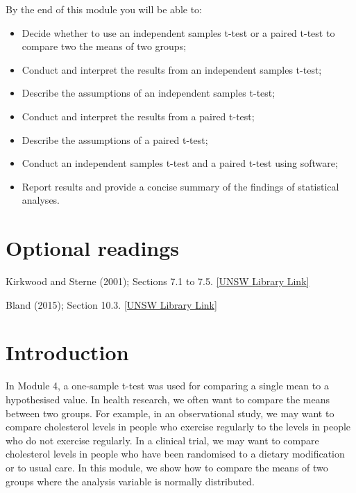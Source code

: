 \documentclass[
  a4paper,
]{memoir}
\providecommand{\tightlist}{%
  \setlength{\itemsep}{0pt}\setlength{\parskip}{0pt}}
\begin{document}

By the end of this module you will be able to:

\begin{itemize}
\tightlist
\item
  Decide whether to use an independent samples t-test or a paired t-test
  to compare two the means of two groups;
\item
  Conduct and interpret the results from an independent samples t-test;
\item
  Describe the assumptions of an independent samples t-test;
\item
  Conduct and interpret the results from a paired t-test;
\item
  Describe the assumptions of a paired t-test;
\item
  Conduct an independent samples t-test and a paired t-test using
  software;
\item
  Report results and provide a concise summary of the findings of
  statistical analyses.
\end{itemize}

\section*{Optional readings}\label{optional-readings-4}


Kirkwood and Sterne (2001); Sections 7.1 to 7.5.
\href{http://er1.library.unsw.edu.au/er/cgi-bin/eraccess.cgi?url=https://ebookcentral.proquest.com/lib/unsw/detail.action?docID=624728}{{[}UNSW
Library Link{]}}

Bland (2015); Section 10.3.
\href{http://er1.library.unsw.edu.au/er/cgi-bin/eraccess.cgi?url=https://ebookcentral.proquest.com/lib/unsw/detail.action?docID=5891730}{{[}UNSW
Library Link{]}}

\section{Introduction}\label{introduction-4}

In Module 4, a one-sample t-test was used for comparing a single mean to
a hypothesised value. In health research, we often want to compare the
means between two groups. For example, in an observational study, we may
want to compare cholesterol levels in people who exercise regularly to
the levels in people who do not exercise regularly. In a clinical trial,
we may want to compare cholesterol levels in people who have been
randomised to a dietary modification or to usual care. In this module,
we show how to compare the means of two groups where the analysis
variable is normally distributed.
\end{document}
